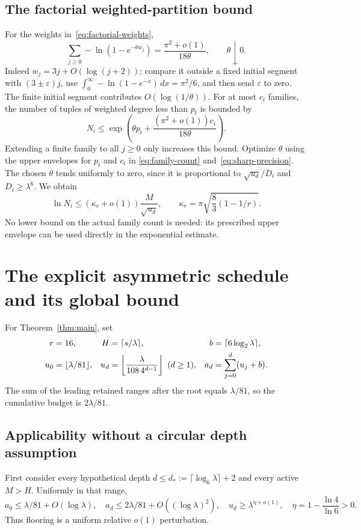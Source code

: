 \documentclass[11pt,letterpaper]{article}
\theoremstyle{remark}\newtheorem{remark}[theorem]{Remark}
\begin{document}
\subsection{The factorial weighted-partition bound}
For the weights in~\eqref{eq:factorial-weights},
\[
 \sum_{j\ge0}-\ln(1-e^{-\theta w_j})
   =\frac{\pi^2+o(1)}{18\theta},\qquad\theta\downarrow0.
\]
Indeed $w_j=3j+O(\log(j+2))$; compare it outside a fixed initial segment
with $(3\pm\varepsilon)j$, use
$\int_0^\infty-\ln(1-e^{-x})\,dx=\pi^2/6$, and then send
$\varepsilon$ to zero. The finite initial segment contributes
$O(\log(1/\theta))$.
For at most $c_i$ families, the number of tuples of weighted degree less
than $p_t$ is bounded by
\[
 N_i\le\exp\left(\theta p_t+
             \frac{(\pi^2+o(1))c_i}{18\theta}\right).
\]
Extending a finite family to all $j\ge0$ only increases this bound.
Optimize $\theta$ using the upper envelopes for $p_t$ and $c_i$ in
\eqref{eq:family-count} and~\eqref{eq:sharp-precision}. The chosen
$\theta$ tends uniformly to zero, since it is proportional to
$\sqrt{u_d}/D_i$ and $D_i\ge\lambda^6$. We obtain
\begin{equation}\label{eq:local-cost}
 \ln N_i\le(\kappa_r+o(1))\frac{M}{\sqrt{u_d}},\qquad
 \kappa_r=\pi\sqrt{\frac83(1-1/r)}.
\end{equation}
No lower bound on the actual family count is needed: its prescribed
upper envelope can be used directly in the exponential estimate.

\section{The explicit asymmetric schedule and its global bound}
\label{sec:asymmetric-schedule}
For Theorem~\ref{thm:main}, set
\begin{align}
 r&=16,& H&=\lceil s/\lambda\rceil,& b&=\lceil6\log_2\lambda\rceil,\notag\\
 u_0&=\lfloor\lambda/81\rfloor,&
 u_d&=\left\lfloor\frac{\lambda}{108\,4^{d-1}}\right\rfloor\ (d\ge1),&
 a_d&=\sum_{j=0}^d(u_j+b).
 \label{eq:main-schedule}
\end{align}
The sum of the leading retained ranges after the root equals
$\lambda/81$, so the cumulative budget is $2\lambda/81$.

\subsection{Applicability without a circular depth assumption}
First consider every hypothetical depth
$d\le d_*:=\lceil\log_6\lambda\rceil+2$ and every active $M>H$.
Uniformly in that range,
\[
 a_0\le\lambda/81+O(\log\lambda),\quad
 a_d\le2\lambda/81+O((\log\lambda)^2),\quad
 u_d\ge\lambda^{\eta+o(1)},\quad
 \eta=1-\frac{\ln4}{\ln6}>0.
\]
Thus flooring is a uniform relative $o(1)$ perturbation.
\end{document}
